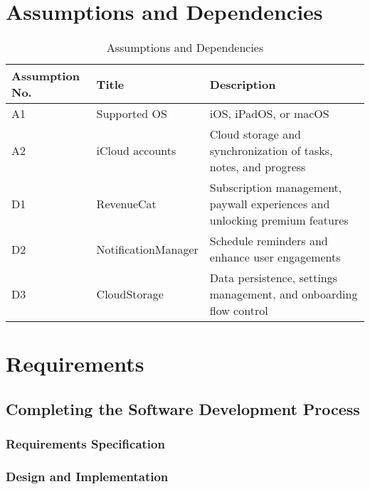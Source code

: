 \documentclass[11pt]{article}
\begin{document}
\section{Assumptions and Dependencies}
\begin{table}[h]
    \centering
    \caption{Assumptions and Dependencies}
    \begin{tabular}{p{2cm} p{3.5cm} p{10cm}}
        \toprule
        Assumption No. 
        & Title 
        & Description \\
        
        \midrule
        A1 
        & Supported OS
        & iOS, iPadOS, or macOS \\

        \midrule
        A2
        & iCloud accounts
        & Cloud storage and synchronization of tasks, notes, and progress \\

        \midrule
        D1
        & RevenueCat 
        & Subscription management, paywall experiences and unlocking premium features \\

        \midrule
        D2
        & NotificationManager 
        & Schedule reminders and enhance user engagements \\

        \midrule
        D3
        & CloudStorage 
        & Data persistence, settings management, and onboarding flow control \\     
        \bottomrule
    \end{tabular}
    \label{tab:docs_rev_hist}
\end{table}

\newpage
\section{Requirements}

\subsection{Completing the Software Development Process}

\subsubsection{Requirements Specification}

\subsubsection{Design and Implementation}
\end{document}
